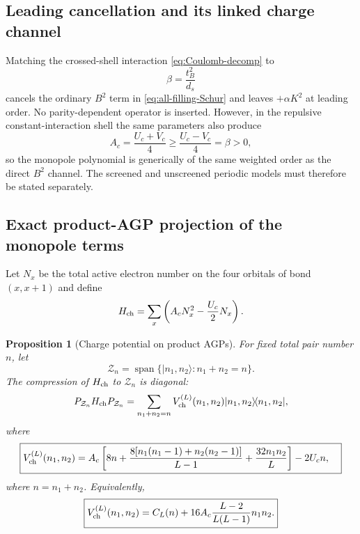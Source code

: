 \documentclass[11pt]{article}
\newtheorem{proposition}[theorem]{Proposition}
\theoremstyle{definition}
\theoremstyle{remark}
\newcommand{\ket}[1]{\lvert #1\rangle}
\newcommand{\bra}[1]{\langle #1\rvert}
\begin{document}
\subsection{Leading cancellation and its linked charge channel}

Matching the crossed-shell interaction \eqref{eq:Coulomb-decomp} to
\begin{equation}
 \beta=\frac{t_B^2}{d_s}
 \label{eq:beta-match}
\end{equation}
cancels the ordinary $B^2$ term in \eqref{eq:all-filling-Schur} and leaves $+\alpha K^2$ at leading order.  No parity-dependent operator is inserted.  However, in the repulsive constant-interaction shell the same parameters also produce
\begin{equation}
 A_c=\frac{U_c+V_c}{4}\ge\frac{U_c-V_c}{4}=\beta>0,
 \label{eq:A-beta-link}
\end{equation}
so the monopole polynomial is generically of the same weighted order as the direct $B^2$ channel.  The screened and unscreened periodic models must therefore be stated separately.

\subsection{Exact product-AGP projection of the monopole terms}

Let $N_x$ be the total active electron number on the four orbitals of bond $(x,x+1)$ and define
\begin{equation}
 H_{\rm ch}=\sum_x\left(A_cN_x^2-\frac{U_c}{2}N_x\right).
\end{equation}

\begin{proposition}[Charge potential on product AGPs]
\label{prop:charge-potential}
For fixed total pair number $n$, let
\begin{equation}
 \mathcal Z_n=\operatorname{span}\{\ket{n_1,n_2}:n_1+n_2=n\}.
\end{equation}
The compression of $H_{\rm ch}$ to $\mathcal Z_n$ is diagonal:
\begin{equation}
 P_{\mathcal Z_n}H_{\rm ch}P_{\mathcal Z_n}
 =\sum_{n_1+n_2=n}V_{\rm ch}^{(L)}(n_1,n_2)
 \ket{n_1,n_2}\!\bra{n_1,n_2},
\end{equation}
where
\begin{equation}
\boxed{
\begin{aligned}
 V_{\rm ch}^{(L)}(n_1,n_2)={}&A_c\left[
 8n+\frac{8[n_1(n_1-1)+n_2(n_2-1)]}{L-1}
 +\frac{32n_1n_2}{L}\right]-2U_cn,
\end{aligned}}
\label{eq:charge-potential}
\end{equation}
where $n=n_1+n_2$.  Equivalently,
\begin{equation}
 \boxed{V_{\rm ch}^{(L)}(n_1,n_2)=C_L(n)+16A_c\frac{L-2}{L(L-1)}n_1n_2.}
 \label{eq:charge-selector}
\end{equation}
\end{proposition}
\end{document}

